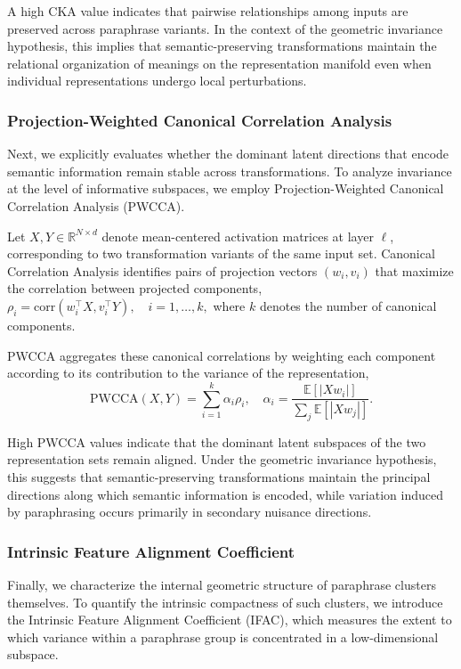 A high CKA value indicates that pairwise relationships among inputs are preserved across paraphrase variants. In the context of the geometric invariance hypothesis, this implies that semantic-preserving transformations maintain the relational organization of meanings on the representation manifold even when individual representations undergo local perturbations.

\subsubsection{Projection-Weighted Canonical Correlation Analysis}

Next, we explicitly evaluates whether the dominant latent directions that encode semantic information remain stable across transformations. 
To analyze invariance at the level of informative subspaces, we employ Projection-Weighted Canonical Correlation Analysis (PWCCA).

Let $X, Y \in \mathbb{R}^{N \times d}$ denote mean-centered activation matrices at layer $\ell$, corresponding to two transformation variants of the same input set. Canonical Correlation Analysis identifies pairs of projection vectors $(w_i, v_i)$ that maximize the correlation between projected components,
\(
\rho_i = \mathrm{corr}(w_i^\top X, v_i^\top Y), \quad i = 1, \ldots, k,
\)
where $k$ denotes the number of canonical components.

PWCCA aggregates these canonical correlations by weighting each component according to its contribution to the variance of the representation,
\begin{equation}
\text{PWCCA}(X, Y) =
\sum_{i=1}^{k} \alpha_i \rho_i, \quad
\alpha_i =
\frac{\mathbb{E}[|X w_i|]}{\sum_j \mathbb{E}[|X w_j|]}.
\end{equation}

High PWCCA values indicate that the dominant latent subspaces of the two representation sets remain aligned. Under the geometric invariance hypothesis, this suggests that semantic-preserving transformations maintain the principal directions along which semantic information is encoded, while variation induced by paraphrasing occurs primarily in secondary nuisance directions.

\subsubsection{Intrinsic Feature Alignment Coefficient}

Finally, we characterize the internal geometric structure of paraphrase clusters themselves. To quantify the intrinsic compactness of such clusters, we introduce the Intrinsic Feature Alignment Coefficient (IFAC), which measures the extent to which variance within a paraphrase group is concentrated in a low-dimensional subspace.

